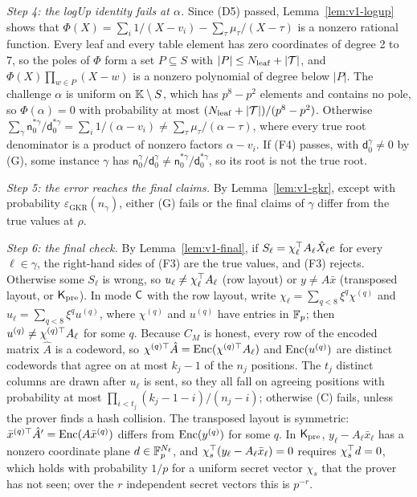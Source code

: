 \emph{Step 4: the logUp identity fails at $\alpha$.} Since (D5) passed, Lemma~\ref{lem:v1-logup}
shows that $\Phi(X) = \sum_i 1/(X - v_i) - \sum_\tau \mu_\tau/(X - \tau)$ is a nonzero rational
function. Every leaf and every table element has zero coordinates of degree 2 to 7, so the poles
of $\Phi$ form a set $P \subseteq S$ with $|P| \le N_{\mathrm{leaf}} + |\mathcal{T}|$, and $\Phi(X) \prod_{w \in P}
(X - w)$ is a nonzero polynomial of degree below $|P|$. The challenge $\alpha$ is uniform on
$\mathbb{K} \setminus S$, which has $p^8 - p^2$ elements and contains no pole, so $\Phi(\alpha) = 0$
with probability at most $(N_{\mathrm{leaf}} + |\mathcal{T}|)/(p^8 - p^2)$. Otherwise $\sum_\gamma \mathsf
n^{\ast\gamma}_0 / \mathsf d^{\ast\gamma}_0 = \sum_i 1/(\alpha - v_i) \ne \sum_\tau \mu_\tau /
(\alpha - \tau)$, where every true root denominator is a product of nonzero factors $\alpha - v_i$.
If (F4) passes, with $\mathsf d_0^\gamma \ne 0$ by (G), some instance $\gamma$ has $\mathsf
n_0^\gamma / \mathsf d_0^\gamma \ne \mathsf n^{\ast\gamma}_0 / \mathsf d^{\ast\gamma}_0$, so its
root is not the true root.

\emph{Step 5: the error reaches the final claims.} By Lemma~\ref{lem:v1-gkr}, except with
probability $\varepsilon_{\mathrm{GKR}}(n_\gamma)$, either (G) fails or the final claims of
$\gamma$ differ from the true values at $\rho$.

\emph{Step 6: the final check.} By Lemma~\ref{lem:v1-final}, if $S_\ell = \chi_\ell^\top A_\ell \hat
X_\ell e$ for every $\ell \in \gamma$, the right-hand sides of (F3) are the true values, and (F3)
rejects. Otherwise some $S_\ell$ is wrong, so $u_\ell \ne \chi_\ell^\top A_\ell$ (row layout) or $y
\ne A \bar x$ (transposed layout, or $\mathsf{K}_{\mathrm{pre}}$). In mode $\mathsf{C}$ with the row layout, write $\chi_\ell
= \sum_{q < 8} \xi^q \chi^{(q)}$ and $u_\ell = \sum_{q<8} \xi^q u^{(q)}$, where $\chi^{(q)}$ and
$u^{(q)}$ have entries in $\mathbb{F}_p$; then $u^{(q)} \ne \chi^{(q)\top} A_\ell$ for some $q$. Because $C_M$
is honest, every row of the encoded matrix $\hat A$ is a codeword, so $\chi^{(q)\top} \hat A =
\mathrm{Enc}(\chi^{(q)\top} A_\ell)$ and $\mathrm{Enc}(u^{(q)})$ are distinct codewords that agree on at most $k_j -
1$ of the $n_j$ positions. The $t_j$ distinct columns are drawn after $u_\ell$ is sent, so they all
fall on agreeing positions with probability at most $\prod_{i<t_j}(k_j - 1 - i)/(n_j - i)$;
otherwise (C) fails, unless the prover finds a hash collision. The transposed layout is symmetric:
$\bar x^{(q)\top} \hat A' = \mathrm{Enc}(A \bar x^{(q)})$ differs from $\mathrm{Enc}(y^{(q)})$ for some $q$. In
$\mathsf{K}_{\mathrm{pre}}$, $y_\ell - A_\ell \bar x_\ell$ has a nonzero coordinate plane $d \in \mathbb{F}_p^{N_\ell}$, and
$\chi_s^\top (y_\ell - A_\ell \bar x_\ell) = 0$ requires $\chi_s^\top d = 0$, which holds with
probability $1/p$ for a uniform secret vector $\chi_s$ that the prover has not seen; over the $r$
independent secret vectors this is $p^{-r}$.

